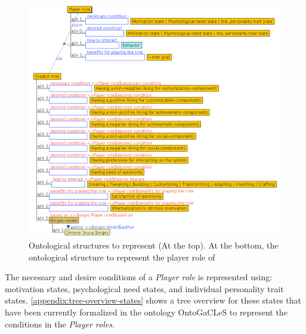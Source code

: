 \begin{figure}[htb]
 \caption[Ontological structures to represent Player role]{Ontological structures to represent  (At the top). At the bottom, the ontological structure to represent the player role of }
 \label{fig:ontological-structure-player-role}
 \centering
 \includegraphics[width=1\textwidth]{images/chap-ontogacles1/ontological-structure-player-role.png}
 \fautor
\end{figure}

The necessary and desire conditions of a \emph{Player role} is represented using: motivation states, psychological need states, and individual personality trait states. \autoref{appendix:tree-overview-states} shows a tree overview for these states that have been currently formalized in the ontology OntoGaCLeS to represent the conditions in the \emph{Player roles}.

